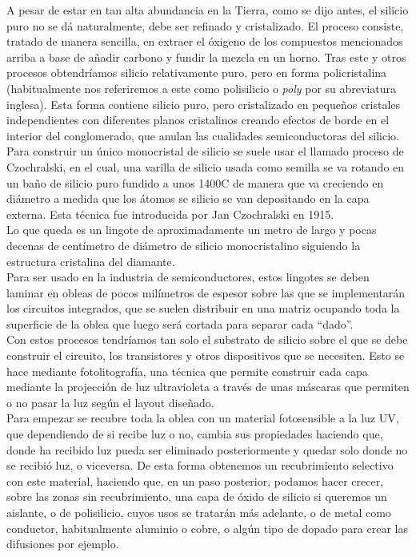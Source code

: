A pesar de estar en tan alta abundancia en la Tierra, como se dijo antes, el silicio
puro no se dá naturalmente, debe ser refinado y cristalizado. El proceso consiste,
tratado de manera sencilla, en extraer el óxigeno de los compuestos mencionados arriba
a base de añadir carbono y fundir la mezcla en un horno. Tras este y otros procesos
obtendríamos silicio relativamente puro, pero en forma policristalina (habitualmente
nos referiremos a este como polisilicio o \textit{poly} por su abreviatura inglesa).
Esta forma contiene silicio puro, pero
cristalizado en pequeños cristales independientes con diferentes planos cristalinos
creando efectos de borde en el interior del conglomerado, que anulan las cualidades
semiconductoras del silicio.\\

Para construir un único monocristal de silicio se suele usar el llamado proceso
de Czochralski, en el cual, una varilla de silicio usada como semilla se va
rotando en un baño de silicio puro fundido a unos 1400\centigrade C de manera que va creciendo
en diámetro a medida que los átomos se silicio se van depositando en la capa externa.
Esta técnica fue introducida por Jan Czochralski en 1915.\\

Lo que queda es un lingote de aproximadamente un metro de largo y pocas decenas
de centímetro de diámetro de silicio monocristalino siguiendo la estructura cristalina del
diamante.\\

Para ser usado en la industria de semiconductores, estos lingotes se deben laminar
en obleas de pocos milímetros de espesor sobre las que se implementarán los
circuitos integrados, que se suelen distribuir en una matriz ocupando toda la
superficie de la oblea que luego será cortada para separar cada ``dado''.\\

Con estos procesos tendríamos tan solo el substrato de silicio sobre el que
se debe construir el circuito, los transistores y otros dispositivos que se
necesiten. Esto se hace mediante fotolitografía, una técnica que permite
construir cada capa mediante la projección de luz ultravioleta a través de
unas máscaras que permiten o no pasar la luz según el layout diseñado.\\

Para empezar se recubre toda la oblea con un material fotosensible a la luz UV,
que dependiendo de si recibe luz o no, cambia sus propiedades haciendo que, donde
ha recibido luz pueda ser eliminado posteriormente y quedar solo donde no se recibió
luz, o viceversa. De esta forma obtenemos un recubrimiento selectivo con este
material, haciendo que, en un paso posterior, podamos hacer crecer, sobre las zonas
sin recubrimiento, una capa de óxido de silicio si queremos un aislante, o de polisilicio,
cuyos usos se tratarán más adelante, o de metal como conductor, habitualmente
aluminio o cobre, o algún tipo de dopado para crear las difusiones por ejemplo.\\

